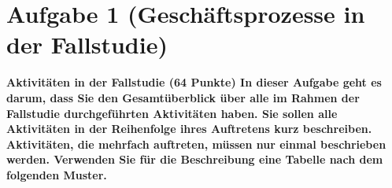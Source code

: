 \section{Aufgabe 1 (Geschäftsprozesse in der Fallstudie)}
\textbf{Aktivitäten in der Fallstudie (64 Punkte) In dieser Aufgabe geht es
darum, dass Sie den Gesamtüberblick über alle im Rahmen der Fallstudie
durchgeführten Aktivitäten haben. Sie sollen alle Aktivitäten in der Reihenfolge
ihres Auftretens kurz beschreiben. Aktivitäten, die mehrfach auftreten, müssen
nur einmal beschrieben werden. Verwenden Sie für die Beschreibung eine Tabelle
nach dem folgenden Muster.}

\clearpage 